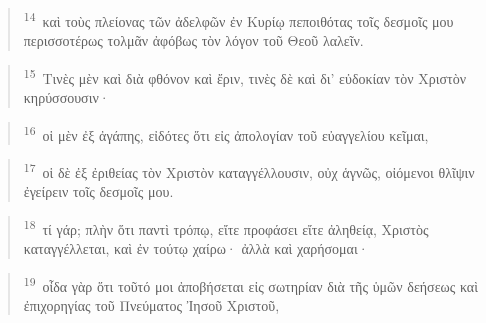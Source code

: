 \documentclass{article}
\newcommand{\currentverse}{1} %
\newcommand{\setcurrentverse}[1]{\renewcommand{\currentverse}{#1}}
\begin{document}
\begin{verse}

\setcurrentverse{14}

\setcounter{footnote}{0}

\textsuperscript{14}~καὶ τοὺς πλείονας τῶν ἀδελφῶν ἐν Κυρίῳ πεποιθότας τοῖς δεσμοῖς μου περισσοτέρως τολμᾶν ἀφόβως τὸν λόγον τοῦ Θεοῦ λαλεῖν.

\end{verse}

\begin{verse}

\setcurrentverse{15}

\setcounter{footnote}{0}

\textsuperscript{15}~Τινὲς μὲν καὶ διὰ φθόνον καὶ ἔριν, τινὲς δὲ καὶ δι’ εὐδοκίαν τὸν Χριστὸν κηρύσσουσιν·

\end{verse}

\begin{verse}

\setcurrentverse{16}

\setcounter{footnote}{0}

\textsuperscript{16}~οἱ μὲν ἐξ ἀγάπης, εἰδότες ὅτι εἰς ἀπολογίαν τοῦ εὐαγγελίου κεῖμαι,

\end{verse}

\begin{verse}

\setcurrentverse{17}

\setcounter{footnote}{0}

\textsuperscript{17}~οἱ δὲ ἐξ ἐριθείας τὸν Χριστὸν καταγγέλλουσιν, οὐχ ἁγνῶς, οἰόμενοι θλῖψιν ἐγείρειν τοῖς δεσμοῖς μου.

\end{verse}

\begin{verse}

\setcurrentverse{18}

\setcounter{footnote}{0}

\textsuperscript{18}~τί γάρ; πλὴν ὅτι παντὶ τρόπῳ, εἴτε προφάσει εἴτε ἀληθείᾳ, Χριστὸς καταγγέλλεται, καὶ ἐν τούτῳ χαίρω· ἀλλὰ καὶ χαρήσομαι·

\end{verse}

\begin{verse}

\setcurrentverse{19}

\setcounter{footnote}{0}

\textsuperscript{19}~οἶδα γὰρ ὅτι τοῦτό μοι ἀποβήσεται εἰς σωτηρίαν διὰ τῆς ὑμῶν δεήσεως καὶ ἐπιχορηγίας τοῦ Πνεύματος Ἰησοῦ Χριστοῦ,

\end{verse}
\end{document}
